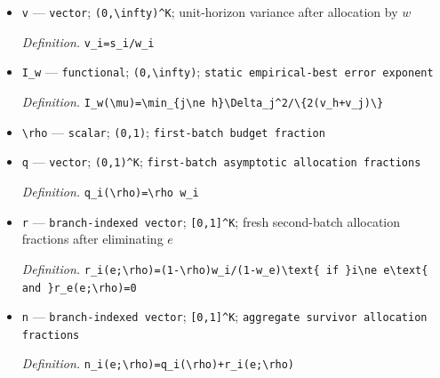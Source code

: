 \documentclass{article}
\begin{document}
\begin{itemize}
  \item \texttt{v} --- \texttt{vector}; \texttt{(0,\allowbreak{}\textbackslash{}\allowbreak{}infty)\textasciicircum{}K}; unit-horizon variance after allocation by \(w\)
  \par\smallskip\noindent\emph{Definition.} \texttt{v\_\allowbreak{}i=\allowbreak{}s\_\allowbreak{}i/\allowbreak{}w\_\allowbreak{}i}
  \item \texttt{I\_\allowbreak{}w} --- \texttt{functional}; \texttt{(0,\allowbreak{}\textbackslash{}\allowbreak{}infty)}; \texttt{static empirical-\allowbreak{}best error exponent}
  \par\smallskip\noindent\emph{Definition.} \texttt{I\_\allowbreak{}w(\textbackslash{}\allowbreak{}mu)=\allowbreak{}\textbackslash{}\allowbreak{}min\_\allowbreak{}\{j\textbackslash{}\allowbreak{}ne h\}\allowbreak{}\textbackslash{}\allowbreak{}Delta\_\allowbreak{}j\textasciicircum{}2/\allowbreak{}\textbackslash{}\allowbreak{}\{2(v\_\allowbreak{}h+\allowbreak{}v\_\allowbreak{}j)\textbackslash{}\allowbreak{}\}\allowbreak{}}
  \item \texttt{\textbackslash{}\allowbreak{}rho} --- \texttt{scalar}; \texttt{(0,\allowbreak{}1)}; \texttt{first-\allowbreak{}batch budget fraction}
  \item \texttt{q} --- \texttt{vector}; \texttt{(0,\allowbreak{}1)\textasciicircum{}K}; \texttt{first-\allowbreak{}batch asymptotic allocation fractions}
  \par\smallskip\noindent\emph{Definition.} \texttt{q\_\allowbreak{}i(\textbackslash{}\allowbreak{}rho)=\allowbreak{}\textbackslash{}\allowbreak{}rho w\_\allowbreak{}i}
  \item \texttt{r} --- \texttt{branch-\allowbreak{}indexed vector}; \texttt{[0,\allowbreak{}1]\textasciicircum{}K}; fresh second-batch allocation fractions after eliminating \(e\)
  \par\smallskip\noindent\emph{Definition.} \texttt{r\_\allowbreak{}i(e;\allowbreak{}\textbackslash{}\allowbreak{}rho)=\allowbreak{}(1-\allowbreak{}\textbackslash{}\allowbreak{}rho)w\_\allowbreak{}i/\allowbreak{}(1-\allowbreak{}w\_\allowbreak{}e)\textbackslash{}\allowbreak{}text\{ if \}\allowbreak{}i\textbackslash{}\allowbreak{}ne e\textbackslash{}\allowbreak{}text\{ and \}\allowbreak{}r\_\allowbreak{}e(e;\allowbreak{}\textbackslash{}\allowbreak{}rho)=\allowbreak{}0}
  \item \texttt{n} --- \texttt{branch-\allowbreak{}indexed vector}; \texttt{[0,\allowbreak{}1]\textasciicircum{}K}; \texttt{aggregate survivor allocation fractions}
  \par\smallskip\noindent\emph{Definition.} \texttt{n\_\allowbreak{}i(e;\allowbreak{}\textbackslash{}\allowbreak{}rho)=\allowbreak{}q\_\allowbreak{}i(\textbackslash{}\allowbreak{}rho)+\allowbreak{}r\_\allowbreak{}i(e;\allowbreak{}\textbackslash{}\allowbreak{}rho)}

\end{itemize}
\end{document}
